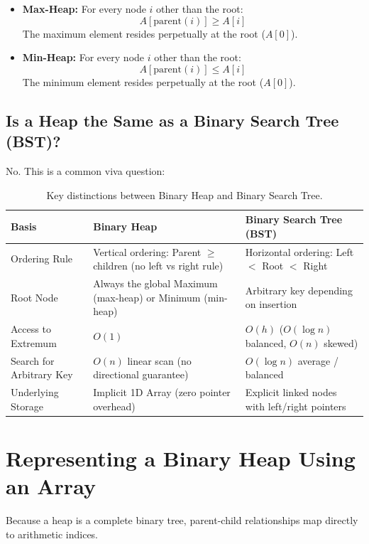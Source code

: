 \begin{itemize}
    \item \textbf{Max-Heap:} For every node $i$ other than the root:
    \[
    A[\text{parent}(i)] \geq A[i]
    \]
    The maximum element resides perpetually at the root ($A[0]$).
    \item \textbf{Min-Heap:} For every node $i$ other than the root:
    \[
    A[\text{parent}(i)] \leq A[i]
    \]
    The minimum element resides perpetually at the root ($A[0]$).
\end{itemize}

\subsection{Is a Heap the Same as a Binary Search Tree (BST)?}

No. This is a common viva question:
\begin{table}[htbp]
\centering
\small
\begin{tabularx}{\textwidth}{l X X}
\toprule
\textbf{Basis} & \textbf{Binary Heap} & \textbf{Binary Search Tree (BST)} \\
\midrule
Ordering Rule     & Vertical ordering: Parent $\geq$ children (no left vs right rule) & Horizontal ordering: Left $<$ Root $<$ Right \\
Root Node         & Always the global Maximum (max-heap) or Minimum (min-heap)        & Arbitrary key depending on insertion \\
Access to Extremum & $O(1)$                                                            & $O(h)$ ($O(\log n)$ balanced, $O(n)$ skewed) \\
Search for Arbitrary Key & $O(n)$ linear scan (no directional guarantee)                & $O(\log n)$ average / balanced \\
Underlying Storage & Implicit 1D Array (zero pointer overhead)                         & Explicit linked nodes with left/right pointers \\
\bottomrule
\end{tabularx}
\caption{Key distinctions between Binary Heap and Binary Search Tree.}
\end{table}

\section{Representing a Binary Heap Using an Array}

Because a heap is a complete binary tree, parent-child relationships map directly to arithmetic indices.

